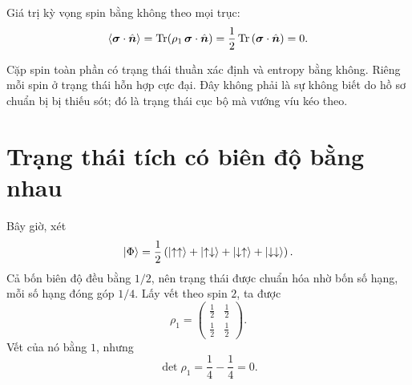 Giá trị kỳ vọng spin bằng không theo mọi trục:
\begin{equation}
\left\langle\bm{\sigma}\cdot\hat{\bm n}\right\rangle
=\operatorname{Tr}\!\left(
\rho_1\,\bm{\sigma}\cdot\hat{\bm n}
\right)
=\frac12\operatorname{Tr}
\left(\bm{\sigma}\cdot\hat{\bm n}\right)
=0.
\end{equation}

\begin{classroomqa}
\end{classroomqa}

Cặp spin toàn phần có trạng thái thuần xác định và entropy bằng không. Riêng mỗi spin ở trạng thái hỗn hợp cực đại. Đây không phải là sự không biết do hồ sơ chuẩn bị bị thiếu sót; đó là trạng thái cục bộ mà vướng víu kéo theo.

\section{Trạng thái tích có biên độ bằng nhau}

Bây giờ, xét
\begin{equation}
\left\lvert\Phi\right\rangle
=\frac12\left(
\left\lvert\uparrow\uparrow\right\rangle
+\left\lvert\uparrow\downarrow\right\rangle
+\left\lvert\downarrow\uparrow\right\rangle
+\left\lvert\downarrow\downarrow\right\rangle
\right).
\end{equation}
Cả bốn biên độ đều bằng \(1/2\), nên trạng thái được chuẩn hóa nhờ bốn số hạng, mỗi số hạng đóng góp \(1/4\). Lấy vết theo spin \(2\), ta được
\begin{equation}
\rho_1
=
\begin{pmatrix}
\frac12&\frac12\\[2pt]
\frac12&\frac12
\end{pmatrix}.
\end{equation}
Vết của nó bằng \(1\), nhưng
\begin{equation}
\det\rho_1
=\frac14-\frac14
=0.
\end{equation}

\begin{classroomqa}
\end{classroomqa}

